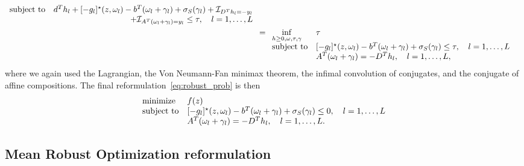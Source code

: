 \begin{equation*}
\begin{aligned}
\begin{array}[t]{ll}
	\mbox{subject to}& d^Th_l + [-g_l]^\star(z,\omega_l) - b^T(\omega_l + \gamma_l) + \sigma_S(\gamma_l) + \indicator_{D^Th_l = -y_l} \\
 &\hfill  + \indicator_{A^T(\omega_l+ \gamma_l) = y_l} \leq \tau, \quad l = 1,\dots,L
\end{array}\\
&= \begin{array}[t]{ll}
	\underset{h \geq 0,\omega,\tau,\gamma}{\inf} &\tau\\
	\mbox{subject to}& [-g_l]^\star(z,\omega_l) - b^T(\omega_l + \gamma_l) + \sigma_S(\gamma_l) \leq \tau, \quad l = 1,\dots,L\\
	& A^T(\omega_l+ \gamma_l) = -D^Th_l,\quad l = 1,\dots,L,
\end{array}\\
\end{aligned}
\end{equation*}
where we again used the Lagrangian, the Von Neumann-Fan minimax theorem, the infimal convolution of conjugates, and the conjugate of affine compositions. The final reformulation~\eqref{eq:robust_prob} is then
\begin{equation*}
\begin{array}[t]{ll}
	{\text{minimize}} & f(z)\\
	\mbox{subject to} & [-g_l]^\star(z,\omega_l) - b^T(\omega_l + \gamma_l) + \sigma_S(\gamma_l) \leq 0, \quad l = 1,\dots,L\\
	 &A^T(\omega_l+ \gamma_l) = -D^Th_l,\quad l = 1,\dots,L.
\end{array}
\end{equation*}

\ifpreprint
\subsection{Mean Robust Optimization reformulation}
\else 
